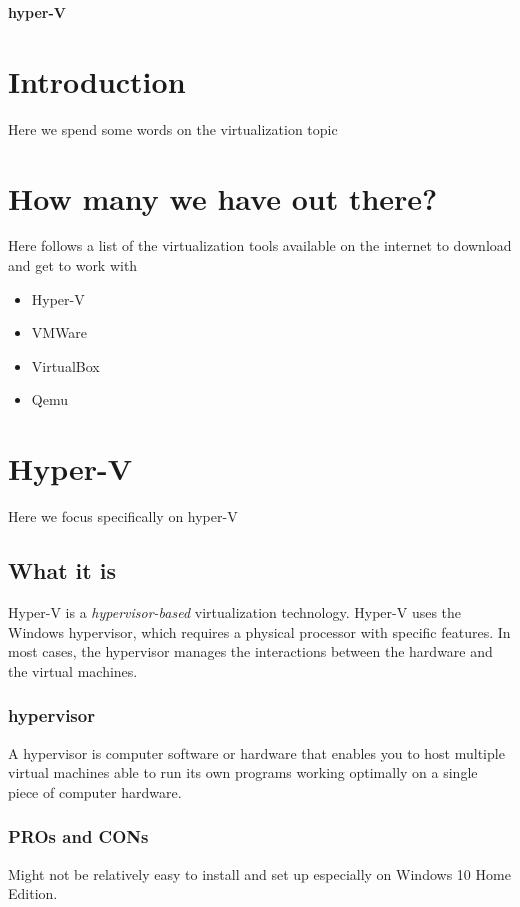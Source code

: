 \documentclass[a4paper,12pt]{article}
\begin{document}
\textbf{hyper-V}

\tableofcontents
\clearpage
 
\section{Introduction}
Here we spend some words on the virtualization topic

\section{How many we have out there?}

Here follows a list of the virtualization tools available on the internet to download and get to work with

\begin{itemize}
\item Hyper-V
\item VMWare
\item VirtualBox
\item Qemu
\end{itemize}

\section{Hyper-V}
Here we focus specifically on hyper-V

\subsection {What it is}
Hyper-V is a \emph{hypervisor-based} virtualization technology. Hyper-V uses the Windows hypervisor, which requires a physical processor with specific features.
In most cases, the hypervisor manages the interactions between the hardware and the virtual machines.

\subsubsection {hypervisor}

A hypervisor is computer software or hardware that enables you to host multiple virtual machines able to run
its own programs working optimally on a single piece of computer hardware.

\subsubsection {PROs and CONs}

Might not be relatively easy to install and set up especially on Windows 10 Home Edition.
\end{document}
